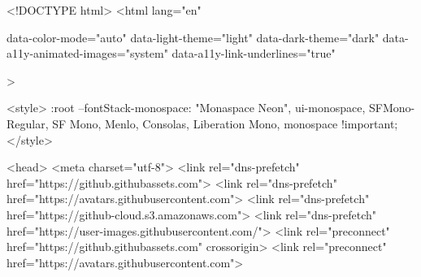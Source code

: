 



  

<!DOCTYPE html>
<html
  lang="en"
  
  data-color-mode="auto" data-light-theme="light" data-dark-theme="dark"
  data-a11y-animated-images="system" data-a11y-link-underlines="true"
  
  >

    <style>
:root {
  --fontStack-monospace: "Monaspace Neon", ui-monospace, SFMono-Regular, SF Mono, Menlo, Consolas, Liberation Mono, monospace !important;
}
</style>




  <head>
    <meta charset="utf-8">
  <link rel="dns-prefetch" href="https://github.githubassets.com">
  <link rel="dns-prefetch" href="https://avatars.githubusercontent.com">
  <link rel="dns-prefetch" href="https://github-cloud.s3.amazonaws.com">
  <link rel="dns-prefetch" href="https://user-images.githubusercontent.com/">
  <link rel="preconnect" href="https://github.githubassets.com" crossorigin>
  <link rel="preconnect" href="https://avatars.githubusercontent.com">



  


